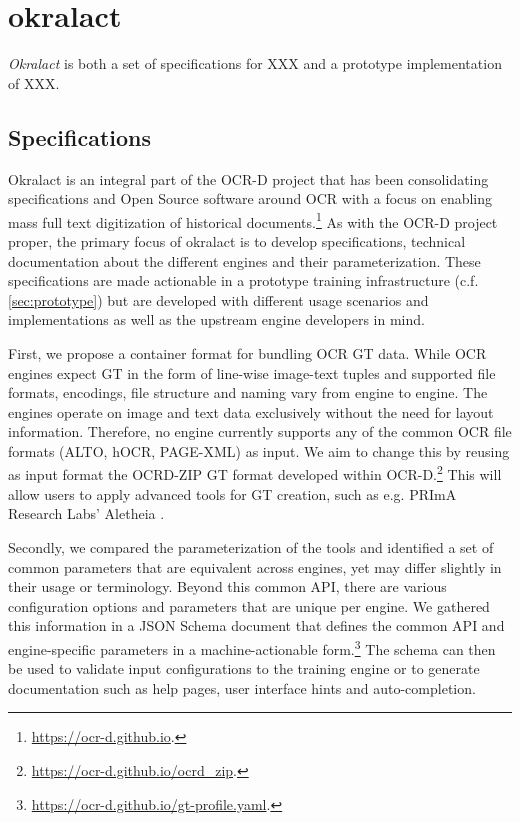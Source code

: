\documentclass[conference]{IEEEtran}
\begin{document}

\section{okralact}

\textit{Okralact} is both a set of specifications for XXX and a prototype
implementation of XXX.

\subsection{Specifications}

Okralact is an integral part of the OCR-D project that has been
consolidating specifications and Open Source software around OCR
with a focus on enabling mass full text digitization of historical
documents.\footnote{\url{https://ocr-d.github.io}.} As with the
OCR-D project proper, the primary focus of okralact is to develop
specifications, technical documentation about the different engines
and their parameterization. These specifications are made
actionable in a prototype training infrastructure (c.f.
\ref{sec:prototype}) but are developed with different usage
scenarios and implementations as well as the upstream engine
developers in mind.

First, we propose a container format for bundling OCR GT data.
While OCR engines expect GT in the form of line-wise image-text
tuples and supported file formats, encodings, file structure and
naming vary from engine to engine. The engines operate on image and
text data exclusively without the need for layout information.
Therefore, no engine currently supports any of the common OCR
file formats (ALTO, hOCR, PAGE-XML) as input. We aim to change this by
reusing as input format the OCRD-ZIP GT format developed within
OCR-D.\footnote{\url{https://ocr-d.github.io/ocrd_zip}.} This will
allow users to apply advanced tools for GT creation, such as e.g. 
PRImA Research Labs' Aletheia \cite{clausner2011aletheia}.

Secondly, we compared the parameterization of the tools and
identified a set of common parameters that are equivalent across
engines, yet may differ slightly in their usage or terminology. Beyond
this common API, there are various configuration options and
parameters that are unique per engine. We gathered this information
in a JSON Schema document that defines the common API and
engine-specific parameters in a machine-actionable
form.\footnote{\url{https://ocr-d.github.io/gt-profile.yaml}.} 
The schema can then be used to validate input configurations to the
training engine or to generate documentation such as help pages, user
interface hints and auto-completion.
\end{document}
